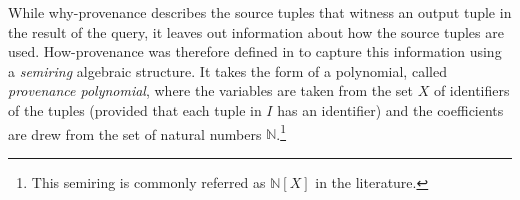 \documentclass[preprint,12pt,sort&compress]{elsarticle}
\newcommand{\rtwo}[1]{\textcolor{reviewer2}{#1}}
\newcommand{\scream}[1]{{\bf * #1 *}{\typeout{#1}}}
\begin{document}
While why-provenance describes the source tuples that witness an output tuple in the result of the query, it leaves out  information about how the source tuples are used.
How-provenance was therefore defined in \citep{howProvenanceGreen} to capture this information using a \emph{semiring} algebraic structure.
It takes the form of a polynomial, called \emph{provenance polynomial}, where the variables are taken from the set $X$ of identifiers of the tuples (provided that each tuple in $I$ has an identifier) and the coefficients are drew from the set of natural numbers $\mathbb{N}$.\footnote{\rtwo{This semiring is commonly referred as $\mathbb{N}[X]$ in the literature.}}
\end{document}
